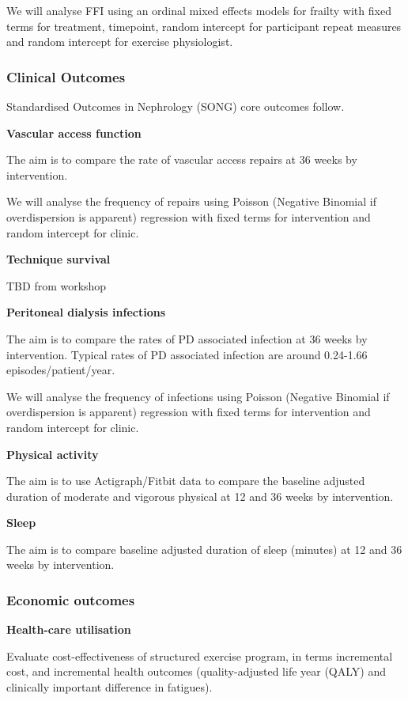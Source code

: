 \documentclass[11pt,parskip=half-]{scrartcl}
\begin{document}
We will analyse FFI using an ordinal mixed effects models for frailty with fixed terms for treatment, timepoint, random intercept for participant repeat measures and random intercept for exercise physiologist.


\subsubsection{Clinical Outcomes}\label{clinical-outcomes}

Standardised Outcomes in Nephrology (SONG) core outcomes follow.

\textbf{Vascular access function}

The aim is to compare the rate of vascular access repairs at 36 weeks by intervention.

We will analyse the frequency of repairs using Poisson (Negative Binomial if overdispersion is apparent) regression with fixed terms for intervention and random intercept for clinic.

\textbf{Technique survival}

TBD from workshop

\textbf{Peritoneal dialysis infections}

The aim is to compare the rates of PD associated infection at 36 weeks by intervention. Typical rates of PD associated infection are around 0.24-1.66 episodes/patient/year.

We will analyse the frequency of infections using Poisson (Negative Binomial if overdispersion is apparent) regression with fixed terms for intervention and random intercept for clinic.

\textbf{Physical activity}

The aim is to use Actigraph/Fitbit data to compare the baseline adjusted duration of moderate and vigorous physical at 12 and 36 weeks by intervention.

\textbf{Sleep}

The aim is to compare baseline adjusted duration of sleep (minutes) at 12 and 36 weeks by intervention.

\subsubsection{Economic outcomes}

\textbf{Health-care utilisation}

Evaluate cost-effectiveness of structured exercise program, in terms incremental cost, and incremental health outcomes (quality-adjusted life year (QALY) and clinically important difference in fatigues).
\end{document}
